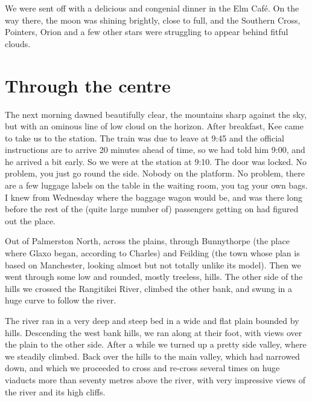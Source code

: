 \documentclass[12pt,a4paper]{article}
\begin{document}
We were sent off with a delicious and congenial dinner in the Elm Caf\'e.
On the way there, the moon was shining brightly, close to full, and the
Southern Cross, Pointers, Orion and a few other stars were struggling to 
appear behind fitful clouds.

\section{Through the centre}

The next morning dawned beautifully clear, the mountains sharp against
the sky, but with an ominous line of low cloud on the horizon.
After breakfast, Kee came to take us to the station. The train was due
to leave at 9:45 and the official instructions are to arrive 20 minutes
ahead of time, so we had told him 9:00, and he arrived a bit early. So
we were at the station at 9:10. The door was locked. No problem, you just
go round the side. Nobody on the platform. No problem, there are a few
luggage labels on the table in the waiting room, you tag your own bags.
I knew from Wednesday where the baggage wagon would be, and was there long
before the rest of the (quite large number of) passengers getting on had
figured out the place.

Out of Palmerston North, across the plains, through Bunnythorpe (the place
where Glaxo began, according to Charles) and Feilding (the town whose
plan is based on Manchester, looking almost but not totally unlike its
model). Then we went through some low and rounded, mostly treeless, hills.
The other side of the hills we crossed the Rangitikei River, climbed the
other bank, and swung in a huge curve to follow the river.

The river ran in a very deep and steep bed in a wide and flat plain bounded
by hills. Descending the west bank hills, we ran along at their foot, with
views over the plain to the other side. After a while we turned up a pretty
side valley, where we steadily climbed. Back over the hills to the main
valley, which had narrowed down, and which we proceeded to cross and
re-cross several times on huge viaducts more than seventy metres above
the river, with very impressive views of the river and its high cliffs.
\end{document}
